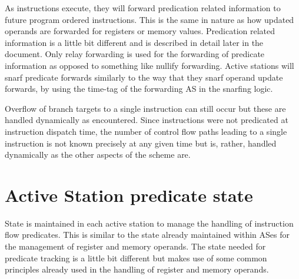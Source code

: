 \documentclass[10pt,dvips]{article}
\begin{document}
As instructions execute, they will forward predication related
information to future program ordered instructions.
This is the same in nature as how updated operands are forwarded
for registers or memory values.  Predication related
information is a little bit different and is described in
detail later in the document.  Only relay forwarding is used
for the forwarding of predicate information as opposed to something
like nullify forwarding.  Active stations will snarf predicate forwards
similarly to the way that they snarf operand update forwards, by
using the time-tag of the forwarding AS in the snarfing logic.

Overflow of branch targets to a single instruction can still occur
but these are handled dynamically as encountered.
Since instructions were not
predicated at instruction dispatch time, the number of control
flow paths leading to a single instruction is not known
precisely at any given time
but is, rather, handled dynamically as the other aspects
of the scheme are.
%
\section{Active Station predicate state}
%
State is maintained in each active station to manage
the handling of instruction flow predicates.
This is similar to the state already maintained within ASes
for the management of register and memory operands.
The state needed for predicate tracking is a little bit
different but makes use of some common principles already used
in the handling of register and memory operands.
\end{document}
